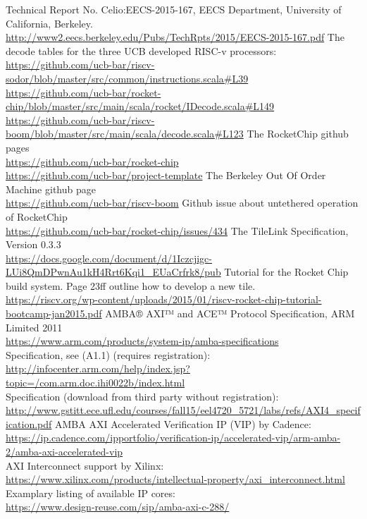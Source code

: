 \documentclass[journal,a4paper]{IEEEtran}
\begin{document}
\begin{thebibliography}{1}
		Technical Report No. Celio:EECS-2015-167, EECS Department, University of California, Berkeley.\\
		\url{http://www2.eecs.berkeley.edu/Pubs/TechRpts/2015/EECS-2015-167.pdf}
		The decode tables for the three UCB developed RISC-v processors:\\
		\url{https://github.com/ucb-bar/riscv-sodor/blob/master/src/common/instructions.scala#L39}\\
		\url{https://github.com/ucb-bar/rocket-chip/blob/master/src/main/scala/rocket/IDecode.scala#L149}\\
		\url{https://github.com/ucb-bar/riscv-boom/blob/master/src/main/scala/decode.scala#L123}
		The RocketChip github pages\\
		\url{https://github.com/ucb-bar/rocket-chip}\\
		\url{https://github.com/ucb-bar/project-template}
		The Berkeley Out Of Order Machine github page\\
		\url{https://github.com/ucb-bar/riscv-boom}
		Github issue about untethered operation of RocketChip\\
		\url{https://github.com/ucb-bar/rocket-chip/issues/434}
		The TileLink Specification, Version 0.3.3\\
		\url{https://docs.google.com/document/d/1Iczcjigc-LUi8QmDPwnAu1kH4Rrt6Kqi1_EUaCrfrk8/pub}
		Tutorial for the  Rocket Chip build system. Page 23ff outline how to develop a new tile.\\
		\url{https://riscv.org/wp-content/uploads/2015/01/riscv-rocket-chip-tutorial-bootcamp-jan2015.pdf}
		AMBA® AXI™ and ACE™ Protocol Specification, ARM Limited 2011\\
		\url{https://www.arm.com/products/system-ip/amba-specifications}\\
		Specification, see (A1.1) (requires registration):\\
		\url{http://infocenter.arm.com/help/index.jsp?topic=/com.arm.doc.ihi0022b/index.html}\\
		Specification (download from third party without registration):\\
		\url{http://www.gstitt.ece.ufl.edu/courses/fall15/eel4720_5721/labs/refs/AXI4_specification.pdf}
		AMBA AXI Accelerated Verification IP (VIP) by Cadence:\\
		\url{https://ip.cadence.com/ipportfolio/verification-ip/accelerated-vip/arm-amba-2/amba-axi-accelerated-vip}\\
		AXI Interconnect support by Xilinx:\\
		\url{https://www.xilinx.com/products/intellectual-property/axi_interconnect.html}\\
		Examplary listing of available IP cores:\\
		\url{https://www.design-reuse.com/sip/amba-axi-c-288/}
\end{thebibliography}
\enlargethispage{-5in}
\end{document}
